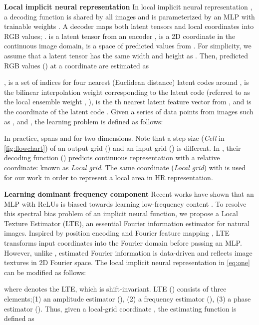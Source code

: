 \documentclass[10pt,twocolumn,letterpaper]{article}
\begin{document}
{\bf Local implicit neural representation} In local implicit neural representation \cite{Local_Implicit_Grid_CVPR20, chen2021learning}, a decoding function  is shared by all images and is parameterized by an MLP with trainable weights . A decoder  maps both latent tensors and local coordinates into RGB values; .  is a latent tensor from an encoder ,  is a 2D coordinate in the continuous image domain,   is a space of predicted values from . For simplicity, we assume that a latent tensor  has the same width and height as . Then, predicted RGB values () at a coordinate  are estimated as


,  is a set of indices for four nearest (Euclidean distance) latent codes around ,  is the bilinear interpolation weight corresponding to the latent code  (referred to as the local ensemble weight \cite{chen2021learning}, ),  is the th nearest latent feature vector from , and  is the coordinate of the latent code . Given a series of  data points from  images such as ,  and , the learning problem is defined as follows:



In practice,  spans  and  for two dimensions. Note that a step size (\textit{Cell} in \cref{fig:flowchart}) of an output grid () and an input grid () is different. In \cite{Local_Implicit_Grid_CVPR20, chen2021learning}, their decoding function () predicts continuous representation with a relative coordinate:   known as \textit{Local grid}. The same coordinate (\textit{Local grid}) with \cite{chen2021learning,Local_Implicit_Grid_CVPR20} is used for our work in order to represent
 a  local area in HR representation.



{\bf Learning dominant frequency component} Recent works have shown that an MLP with ReLUs is biased towards learning low-frequency content \cite{DBLP:conf/icml/RahamanBADLHBC19}. To resolve this spectral bias problem of an implicit neural function, we propose a Local Texture Estimator (LTE), an essential Fourier information estimator for natural images. Inspired by position encoding \cite{mildenhall2020nerf} and Fourier feature mapping \cite{tancik2020fourfeat}, LTE transforms input coordinates into the Fourier domain before passing an MLP. However, unlike \cite{mildenhall2020nerf, tancik2020fourfeat}, estimated Fourier information is data-driven and reflects image textures in 2D Fourier space. The local implicit neural representation in \cref{eq:one} can be modified as follows:

where  denotes the LTE, which is shift-invariant. LTE () consists of three elements;(1) an amplitude estimator (), (2) a frequency estimator (), (3) a phase estimator (). Thus, given a local-grid coordinate , the estimating function  is defined as
\end{document}
